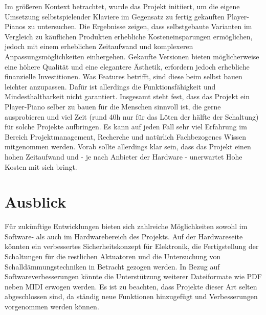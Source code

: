 Im größeren Kontext betrachtet, wurde das Projekt initiiert, um die eigene Umsetzung selbstspielender Klaviere
im Gegensatz zu fertig gekauften Player-Pianos zu untersuchen.
Die Ergebnisse zeigen, dass selbstgebaute Varianten im Vergleich zu käuflichen Produkten erhebliche Kosteneinsparungen
ermöglichen, jedoch mit einem erheblichen Zeitaufwand und komplexeren Anpassungsmöglichkeiten einhergehen. Gekaufte Versionen
bieten möglicherweise eine höhere Qualität und eine elegantere Ästhetik, erfordern jedoch erhebliche finanzielle
Investitionen.
Was Features betrifft, sind diese beim selbst bauen leichter anzupassen.
Dafür ist allerdings die Funktionsfähigkeit und  Mindesthaltbarkeit nicht garantiert. \newline
Insgesamt steht fest, dass das Projekt ein Player-Piano selber zu bauen für die Menschen sinnvoll ist, die
gerne ausprobieren und viel Zeit (rund 40h nur für das Löten der hälfte der Schaltung) für solche Projekte aufbringen.
Es kann auf jeden Fall sehr viel Erfahrung im Bereich Projektmanagement, Recherche und natürlich Fachbezogenes Wissen
mitgenommen werden. Vorab sollte allerdings klar sein, dass das Projekt einen hohen Zeitaufwand und - je nach Anbieter der
Hardware - unerwartet Hohe Kosten mit sich bringt.


\section{Ausblick}

Für zukünftige Entwicklungen bieten sich zahlreiche Möglichkeiten sowohl im Software- als auch im Hardwarebereich des
Projekts. Auf der Hardwareseite könnten ein verbessertes Sicherheitskonzept für Elektronik, die Fertigstellung der
Schaltungen für die restlichen Aktuatoren und die Untersuchung von Schalldämmungstechniken in Betracht gezogen werden.
In Bezug auf Softwareverbesserungen könnte die Unterstützung weiterer Dateiformate wie PDF neben MIDI erwogen werden.
Es ist zu beachten, dass Projekte dieser Art selten abgeschlossen sind, da ständig neue Funktionen hinzugefügt und
Verbesserungen vorgenommen werden können.

